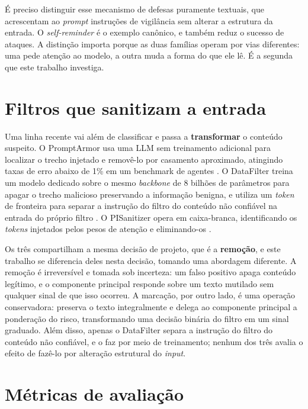 É preciso distinguir esse mecanismo de defesas puramente textuais, que
acrescentam ao \textit{prompt} instruções de vigilância sem alterar a estrutura
da entrada. O \textit{self-reminder} \cite{xie2023selfreminder} é o exemplo
canônico, e também reduz o sucesso de ataques. A distinção importa porque as duas
famílias operam por vias diferentes: uma pede atenção ao modelo, a outra muda a
forma do que ele lê. É a segunda que este trabalho investiga.

\section{Filtros que sanitizam a entrada}\label{sec:sanitizacao}

Uma linha recente vai além de classificar e passa a \textbf{transformar} o
conteúdo suspeito. O PromptArmor usa uma LLM sem treinamento adicional para
localizar o trecho injetado e removê-lo por casamento aproximado, atingindo
taxas de erro abaixo de 1\% em um benchmark de agentes \cite{shi2025promptarmor}.
O DataFilter treina um modelo dedicado sobre o mesmo \textit{backbone} de 8
bilhões de parâmetros para apagar o trecho malicioso preservando a informação
benigna, e utiliza um \textit{token} de fronteira para separar a instrução do
filtro do conteúdo não confiável na entrada do próprio filtro \cite{wang2025datafilter}. O PISanitizer opera em
caixa-branca, identificando os \textit{tokens} injetados pelos pesos de atenção
e eliminando-os \cite{geng2025pisanitizer}.

Os três compartilham a mesma decisão de projeto, que é a \textbf{remoção},
e este trabalho se diferencia deles nesta decisão, tomando uma abordagem diferente.
A remoção é irreversível e tomada sob incerteza: 
um falso positivo apaga conteúdo legítimo, e o componente
principal responde sobre um texto mutilado sem qualquer sinal de que isso
ocorreu. A marcação, por outro lado, é uma operação conservadora: preserva o
texto integralmente e delega ao componente principal a ponderação do risco,
transformando uma decisão binária do filtro em um sinal graduado. Além disso,
apenas o DataFilter separa a instrução do filtro do conteúdo não confiável, e o
faz por meio de treinamento; nenhum dos três avalia o efeito de fazê-lo por
alteração estrutural do \textit{input}.

\section{Métricas de avaliação}\label{sec:metricas_fund}

